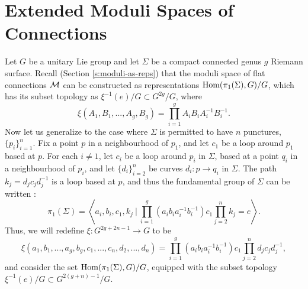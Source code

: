 	
	
	\section{Extended Moduli Spaces of Connections}
	Let $G$ be a unitary Lie group and let $\Sigma$ be a compact connected genus $g$ Riemann surface. Recall (Section \ref{s:moduli-as-reps}) that the moduli space of flat connections $\mathcal{M}$ can be constructed as representations $\text{Hom}(\pi_1(\Sigma),G)/G$, which has its subset topology as $\xi^{-1}(e)/G \subset G^{2g}/G$, where 
	\begin{equation}
		\xi(A_1,B_1,...,A_g,B_g) = \prod_{i=1}^g A_iB_iA_i^{-1}B_i^{-1}.
	\end{equation} 
	Now let us generalize to the case where $\Sigma$ is permitted to have $n$ punctures, $\{p_i\}_{i=1}^n$. Fix a point $p$ in a neighbourhood of $p_1$, and let $c_1$ be a loop around $p_1$ based at $p$. For each $i\neq 1$, let $c_i$ be a loop around $p_i$ in $\Sigma$, based at a point $q_i$ in a neighbourhood of $p_i$, and let $\{d_i\}_{i=2}^n$ be curves $d_i:p\to q_i$ in $\Sigma$. The path $k_j=d_jc_jd_j^{-1}$ is a loop based at $p$, and thus the fundamental group of $\Sigma$ can be written \cite[Eqn. 2.2]{hurtubise_representations_2000}:
	\begin{equation}
		\pi_1(\Sigma) = \left\langle a_i, b_i, c_1, k_j ~\bigg|~ \prod_{i=1}^{g}(a_ib_ia_i^{-1}b_i^{-1})c_1\prod_{j=2}^{n}k_j=e\right\rangle.
	\end{equation}
	Thus, we will redefine $\xi:G^{2g+2n-1}\to G$ to be
	\begin{equation}
		\xi(a_1,b_1,...,a_g,b_g,c_1,...,c_n,d_2,...,d_n) = \prod_{i=1}^{g}(a_ib_ia_i^{-1}b_i^{-1})c_1\prod_{j=2}^{n}d_jc_jd_j^{-1},
	\end{equation}
	and consider the set $\text{Hom}(\pi_1(\Sigma),G)/G$, equipped with the subset topology $\xi^{-1}(e)/G\subset G^{2(g+n)-1}/G$.
	
